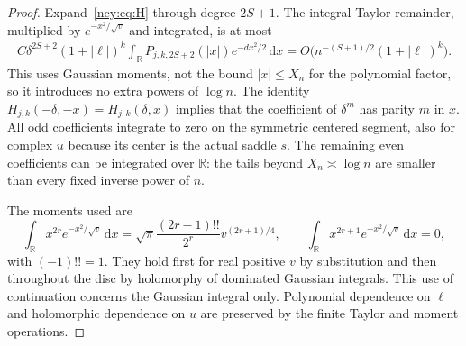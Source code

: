 \documentclass[11pt,letterpaper]{article}
\numberwithin{equation}{section}
\theoremstyle{remark}\newtheorem{remark}[theorem]{Remark}
\newcommand{\dd}{\,\mathrm d}
\theoremstyle{definition}\newtheorem{definition}[theorem]{Definition}\theoremstyle{plain}
\begin{document}
\begin{proof}
Expand~\eqref{ncy:eq:H} through degree $2S+1$. The integral Taylor
remainder, multiplied by $e^{-x^2/\sqrt v}$ and integrated, is at most
\begin{align}\label{ncy:eq:integratedrem}
 C\delta^{2S+2}(1+|\ell|)^k
       \int_{\mathbb R}P_{j,k,2S+2}(|x|)e^{-dx^2/2}\dd x
  =O\bigl(n^{-(S+1)/2}(1+|\ell|)^k\bigr).
\end{align}
This uses Gaussian moments, not the bound $|x|\leq X_n$ for the
polynomial factor, so it introduces no extra powers of $\log n$.
The identity $H_{j,k}(-\delta,-x)=H_{j,k}(\delta,x)$ implies that
the coefficient of $\delta^m$ has parity $m$ in $x$. All odd
coefficients integrate to zero on the symmetric centered segment,
also for complex $u$ because its center is the actual saddle $s$.
The remaining even coefficients can be integrated over $\mathbb R$:
the tails beyond $X_n\asymp\log n$ are smaller than every fixed
inverse power of $n$.

The moments used are
\begin{equation}\label{ncy:eq:moments}
 \int_{\mathbb R}x^{2r}e^{-x^2/\sqrt v}\dd x
  =\sqrt\pi\frac{(2r-1)!!}{2^r}v^{(2r+1)/4},\qquad
 \int_{\mathbb R}x^{2r+1}e^{-x^2/\sqrt v}\dd x=0,
\end{equation}
with $(-1)!!=1$. They hold first for real positive $v$ by substitution
and then throughout the disc by holomorphy of dominated Gaussian
integrals. This use of continuation concerns the Gaussian integral
only. Polynomial dependence on $\ell$ and holomorphic dependence on
$u$ are preserved by the finite Taylor and moment operations.
\end{proof}
\end{document}

